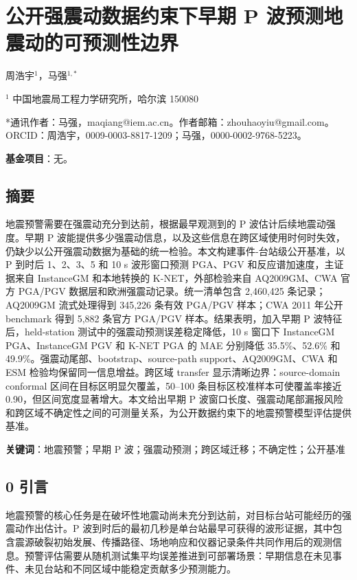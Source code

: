 \documentclass[
  11pt,
]{ctexart}
\author{}
\date{}
\begin{document}
\section{公开强震动数据约束下早期 P
波预测地震动的可预测性边界}\label{ux516cux5f00ux5f3aux9707ux52a8ux6570ux636eux7ea6ux675fux4e0bux65e9ux671f-p-ux6ce2ux9884ux6d4bux5730ux9707ux52a8ux7684ux53efux9884ux6d4bux6027ux8fb9ux754c}

周浩宇\(^{1}\)，马强\(^{1,*}\)

\(^{1}\) 中国地震局工程力学研究所，哈尔滨 150080

*通讯作者：马强，maqiang@iem.ac.cn。作者邮箱：zhouhaoyiu@gmail.com。ORCID：周浩宇，0009-0003-8817-1209；马强，0000-0002-9768-5223。

\textbf{基金项目}：无。

\subsection{摘要}\label{ux6458ux8981}

地震预警需要在强震动充分到达前，根据最早观测到的 P
波估计后续地震动强度。早期 P
波能提供多少强震动信息，以及这些信息在跨区域使用时何时失效，仍缺少以公开强震动数据为基础的统一检验。本文构建事件-台站级公开基准，以
P 到时后 1、2、3、5 和 10 s 波形窗口预测 PGA、PGV
和反应谱加速度，主证据来自 InstanceGM 和本地转换的 K-NET，外部检验来自
AQ2009GM、CWA 官方 PGA/PGV 数据层和欧洲强震动记录。统一清单包含
2,460,425 条记录；AQ2009GM 流式处理得到 345,226 条有效 PGA/PGV 样本；CWA
2011 年公开 benchmark 得到 5,882 条官方 PGA/PGV 样本。结果表明，加入早期
P 波特征后，held-station 测试中的强震动预测误差稳定降低，10 s 窗口下
InstanceGM PGA、InstanceGM PGV 和 K-NET PGA 的 MAE 分别降低
35.5\%、52.6\% 和 49.9\%。强震动尾部、bootstrap、source-path
support、AQ2009GM、CWA 和 ESM 检验均保留同一信息增益。跨区域 transfer
显示清晰边界：source-domain conformal 区间在目标区明显欠覆盖，50--100
条目标区校准样本可使覆盖率接近 0.90，但区间宽度显著增大。本文给出早期 P
波窗口长度、强震动尾部漏报风险和跨区域不确定性之间的可测量关系，为公开数据约束下的地震预警模型评估提供基准。

\textbf{关键词}：地震预警；早期 P
波；强震动预测；跨区域迁移；不确定性；公开基准

\subsection{0 引言}\label{ux5f15ux8a00}

地震预警的核心任务是在破坏性地震动尚未充分到达前，对目标台站可能经历的强震动作出估计。P
波到时后的最初几秒是单台站最早可获得的波形证据，其中包含震源破裂初始发展、传播路径、场地响应和仪器记录条件共同作用后的观测信息。预警评估需要从随机测试集平均误差推进到可部署场景：早期信息在未见事件、未见台站和不同区域中能稳定贡献多少预测能力。
\end{document}
